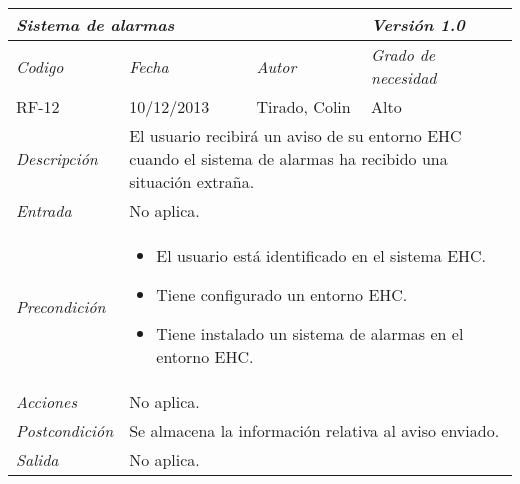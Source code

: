 \begin{tabular}{|p{3cm}|p{4cm}|p{4cm}|p{4cm}|}
\hline \multicolumn{3}{|p{9cm}|}{\textit{Sistema de alarmas}} & \textit{Versi\'on 1.0} \\
\hline \textit{Codigo} & \textit{Fecha} & \textit{Autor} & \textit{Grado de necesidad} \\
RF-12 & 10/12/2013 & Tirado, Colin & Alto \\
\hline \textit{Descripci\'on} & \multicolumn{3}{|p{9cm}|}{El usuario recibir\'a un aviso de su entorno EHC cuando el sistema de alarmas ha recibido una situaci\'on extra\~na.} \\
\hline \textit{Entrada} & \multicolumn{3}{|p{9cm}|}{No aplica.} \\
\hline \textit{Precondici\'on} & \multicolumn{3}{|p{9cm}|}{
\begin{itemize}
\item El usuario est\'a identificado en el sistema EHC.
\item Tiene configurado un entorno EHC.
\item Tiene instalado un sistema de alarmas en el entorno EHC.
\end{itemize}
} \\
\hline \textit{Acciones} & \multicolumn{3}{|p{9cm}|}{No aplica.} \\
\hline \textit{Postcondici\'on} & \multicolumn{3}{|p{9cm}|}{Se almacena la informaci\'on relativa al aviso enviado.} \\
\hline \textit{Salida} & \multicolumn{3}{|p{9cm}|}{No aplica.} \\ \hline
\end{tabular}